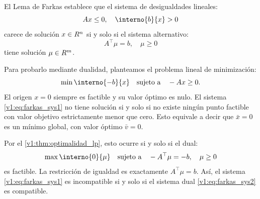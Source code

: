 \begin{example}\label{v1:exa:farkas_dualidad}
 El Lema de Farkas establece que el sistema de desigualdades lineales:
 \begin{equation}
 Ax \le 0, \quad \interno{b}{x} > 0
 \label{v1:eq:farkas_sys1}
 \end{equation}
 carece de solución $x \in R^n$ si y solo si el sistema alternativo:
 \begin{equation}
 A^\top \mu = b, \quad \mu \ge 0
 \label{v1:eq:farkas_sys2}
 \end{equation}
 tiene solución $\mu \in R^m$.
 
 Para probarlo mediante dualidad, planteamos el problema lineal de minimización:
 \[
 \min \interno{-b}{x} \quad \text{sujeto a} \quad -Ax \ge 0.
 \]
 El origen $x = 0$ siempre es factible y su valor óptimo es nulo. El sistema \eqref{v1:eq:farkas_sys1} no tiene solución si y solo si no existe ningún punto factible con valor objetivo estrictamente menor que cero. Esto equivale a decir que $\bar{x} = 0$ es un mínimo global, con valor óptimo $\bar{v} = 0$.
 
 Por el \cref{v1:thm:optimalidad_lp}, esto ocurre si y solo si el dual:
 \[
 \max \interno{0}{\mu} \quad \text{sujeto a} \quad -A^\top \mu = -b, \quad \mu \ge 0
 \]
 es factible. La restricción de igualdad es exactamente $A^\top \mu = b$. Así, el sistema \eqref{v1:eq:farkas_sys1} es incompatible si y solo si el sistema dual \eqref{v1:eq:farkas_sys2} es compatible.
\end{example}

